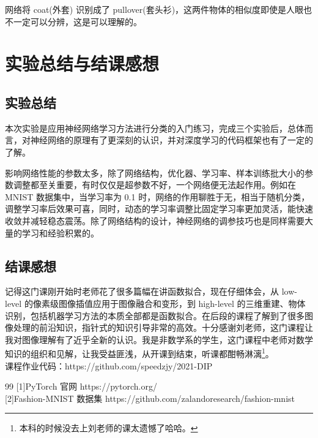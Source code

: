 \documentclass[12pt]{article}
\begin{document}
	网络将 coat(外套) 识别成了 pullover(套头衫)，这两件物体的相似度即使是人眼也不一定可以分辨，这是可以理解的。


	\section{实验总结与结课感想}
	
	\subsection{实验总结}
	本次实验是应用神经网络学习方法进行分类的入门练习，完成三个实验后，总体而言，对神经网络的原理有了更深刻的认识，并对深度学习的代码框架也有了一定的了解。
	
	影响网络性能的参数太多，除了网络结构，优化器、学习率、样本训练批大小的参数调整都至关重要，有时仅仅是超参数不好，一个网络便无法起作用。例如在 MNIST 数据集中，当学习率为 0.1 时，网络的作用聊胜于无，相当于随机分类，调整学习率后效果可喜，同时，动态的学习率调整比固定学习率更加灵活，能快速收敛并减轻稳态震荡。除了网络结构的设计，神经网络的调参技巧也是同样需要大量的学习和经验积累的。
	
	\subsection{结课感想}
	
	记得这门课刚开始时老师花了很多篇幅在讲函数拟合，现在仔细体会，从 low-level 的像素级图像插值应用于图像融合和变形，到 high-level 的三维重建、物体识别，包括机器学习方法的本质全部都是函数拟合。在后段的课程了解到了很多图像处理的前沿知识，指针式的知识引导非常的高效。十分感谢刘老师，这门课程让我对图像理解有了近乎全新的认识。我是非数学系的学生，这门课程中老师对数学知识的组织和见解，让我受益匪浅，从开课到结束，听课都酣畅淋漓\footnote{本科的时候没去上刘老师的课太遗憾了哈哈。}。 \\
	
	课程作业代码：https://github.com/speedzjy/2021-DIP 
	
	\begin{thebibliography}{99}
		[1]PyTorch 官网 https://pytorch.org/ \\
		
		[2]Fashion-MNIST 数据集 https://github.com/zalandoresearch/fashion-mnist
		
	\end{thebibliography}
\end{document}
